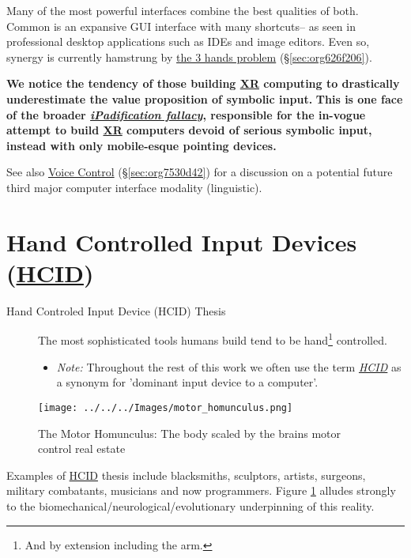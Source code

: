 \documentclass[logo,bsc,singlespacing,parskip]{infthesis}
\begin{document}
Many of the most powerful interfaces combine the best qualities of both.
Common is an expansive GUI interface with many shortcuts-- as seen in professional desktop applications such as IDEs and image editors.
Even so, synergy is currently hamstrung by \hyperref[sec:org626f206]{the 3 hands problem} (\S \ref{sec:org626f206}).

\textbf{We notice the tendency of those building \hyperref[org1d567af]{XR} computing to drastically underestimate the value proposition of symbolic input.}
\textbf{This is one face of the broader \emph{\hyperref[ipadification fallacy]{iPadification fallacy}}, responsible for the in-vogue attempt to build \hyperref[org1d567af]{XR} computers devoid of serious symbolic input, instead with only mobile-esque pointing devices.}

See also \hyperref[sec:org7530d42]{Voice Control} (\S \ref{sec:org7530d42}) for a discussion on a potential future third major computer interface modality (linguistic).

\section{Hand Controlled Input Devices (\hyperref[orgc00eca5]{HCID})}
\label{sec:org5e51c56}
\begin{mdframed}
\begin{description}
\item[{Hand Controled Input Device (\label{orgc00eca5}HCID) Thesis}] The most sophisticated tools humans build tend to be hand\footnote{And by extension including the arm.} controlled.
\begin{itemize}
\item \emph{Note:} Throughout the rest of this work we often use the term \emph{\hyperref[orgc00eca5]{HCID}} as a synonym for 'dominant input device to a computer'.
\end{itemize}
\end{description}
\end{mdframed}

\begin{figure}[h]
\centering
\texttt{[image: ../../../Images/motor\_homunculus.png]}
\caption{\label{fig:motohomo}The Motor Homunculus: The body scaled by the brains motor control real estate}
\end{figure}

Examples of \hyperref[orgc00eca5]{HCID} thesis include blacksmiths, sculptors, artists, surgeons, military combatants, musicians and now programmers.
Figure \ref{fig:motohomo} alludes strongly to the biomechanical/neurological/evolutionary underpinning of this reality.
\end{document}
